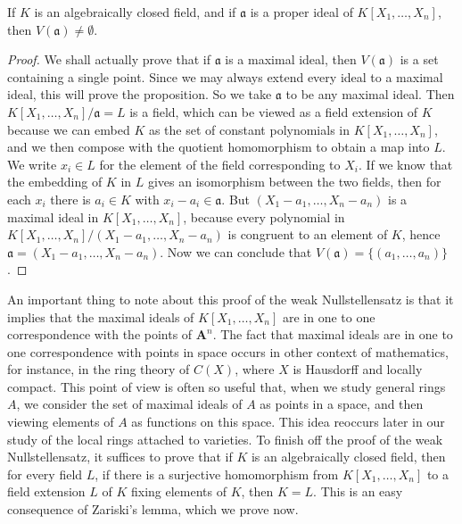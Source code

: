 \begin{lemma}
    If $K$ is an algebraically closed field, and if $\mathfrak{a}$ is a proper ideal of $K[X_1, \dots, X_n]$, then $V(\mathfrak{a}) \neq \emptyset$.
\end{lemma}
\begin{proof}
    We shall actually prove that if $\mathfrak{a}$ is a maximal ideal, then $V(\mathfrak{a})$ is a set containing a single point. Since we may always extend every ideal to a maximal ideal, this will prove the proposition. So we take $\mathfrak{a}$ to be any maximal ideal. Then $K[X_1, \dots, X_n]/\mathfrak{a} = L$ is a field, which can be viewed as a field extension of $K$ because we can embed $K$ as the set of constant polynomials in $K[X_1, \dots, X_n]$, and we then compose with the quotient homomorphism to obtain a map into $L$. We write $x_i \in L$ for the element of the field corresponding to $X_i$. If we know that the embedding of $K$ in $L$ gives an isomorphism between the two fields, then for each $x_i$ there is $a_i \in K$ with $x_i - a_i \in \mathfrak{a}$. But $(X_1 - a_1, \dots, X_n - a_n)$ is a maximal ideal in $K[X_1, \dots, X_n]$, because every polynomial in $K[X_1, \dots, X_n]/(X_1 - a_1, \dots, X_n - a_n)$ is congruent to an element of $K$, hence $\mathfrak{a} = (X_1 - a_1, \dots, X_n - a_n)$. Now we can conclude that $V(\mathfrak{a}) = \{ (a_1, \dots, a_n) \}$.
\end{proof}

An important thing to note about this proof of the weak Nullstellensatz is that it implies that the maximal ideals of $K[X_1, \dots, X_n]$ are in one to one correspondence with the points of $\mathbf{A}^n$. The fact that maximal ideals are in one to one correspondence with points in space occurs in other context of mathematics, for instance, in the ring theory of $C(X)$, where $X$ is Hausdorff and locally compact. This point of view is often so useful that, when we study general rings $A$, we consider the set of maximal ideals of $A$ as points in a space, and then viewing elements of $A$ as functions on this space. This idea reoccurs later in our study of the local rings attached to varieties. To finish off the proof of the weak Nullstellensatz, it suffices to prove that if $K$ is an algebraically closed field, then for every field $L$, if there is a surjective homomorphism from $K[X_1, \dots, X_n]$ to a field extension $L$ of $K$ fixing elements of $K$, then $K = L$. This is an easy consequence of Zariski's lemma, which we prove now.

